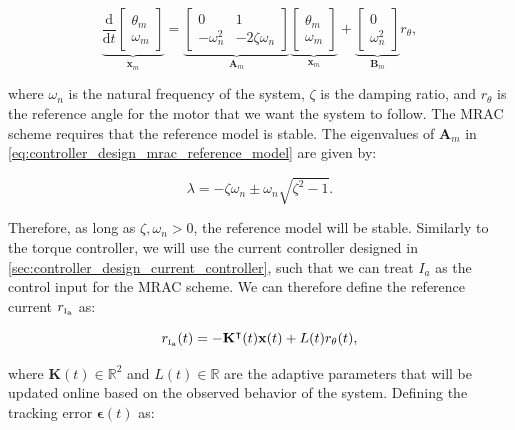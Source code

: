 \begin{equation}
    \label{eq:controller_design_mrac_reference_model}
    \underbrace{
    \frac{\mathrm{d}}{\mathrm{d}t} \begin{bmatrix}
        \theta_m\\
        \omega_m
    \end{bmatrix}}_{\dot{\mathbf{x}}_m} = \underbrace{\begin{bmatrix}
        0 & 1 \\
        -\omega_n^2 & -2 \zeta \omega_n
    \end{bmatrix}}_{\mathbf{A}_m} \underbrace{\begin{bmatrix}
        \theta_m\\
        \omega_m
    \end{bmatrix}}_{\mathbf{x}_m} + \underbrace{\begin{bmatrix}
        0 \\
        \omega_n^2
    \end{bmatrix}}_{\mathbf{B}_m} r_{\theta},
\end{equation}

where $\omega_n$ is the natural frequency of the system, $\zeta$ is the damping ratio, and $r_{\theta}$ is the reference angle for the motor that we want the system to follow. The MRAC scheme requires that the reference model is stable. The eigenvalues of $\mathbf{A}_m$ in \cref{eq:controller_design_mrac_reference_model} are given by:

\begin{equation}
    \label{eq:controller_design_mrac_reference_model_eigenvalues}
    \lambda = -\zeta \omega_n \pm \omega_n \sqrt{\zeta^2 - 1}.
\end{equation}

Therefore, as long as $\zeta, \omega_n > 0$, the reference model will be stable. Similarly to the torque controller, we will use the current controller designed in \cref{sec:controller_design_current_controller}, such that we can treat $I_a$ as the control input for the MRAC scheme. We can therefore define the reference current $r_{{\scriptscriptstyle\mathrm{I_a}}}$ as:

\begin{equation}
    \label{eq:controller_design_mrac_reference_current}
    r_{{\scriptscriptstyle\mathrm{I_a}}}(t) = -\mathbf{K}^\intercal(t) \mathbf{x}(t) + L(t) r_{\theta}(t),
\end{equation}

where $\mathbf{K}(t) \in \mathbb{R}^2$ and $L(t) \in \mathbb{R}$ are the adaptive parameters that will be updated online based on the observed behavior of the system. Defining the tracking error $\boldsymbol{\epsilon}(t)$ as:

